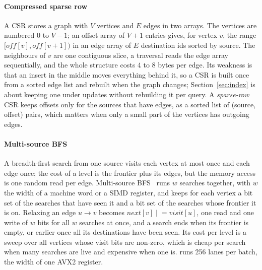 \paragraph{Compressed sparse row} A CSR stores a graph with $V$ vertices and $E$ edges in two arrays. The vertices are
numbered $0$ to $V-1$; an offset array of $V+1$ entries gives, for vertex $v$, the range $[\mathit{off}[v],
\mathit{off}[v+1])$ in an edge array of $E$ destination ids sorted by source. The neighbours of $v$ are one contiguous
slice, a traversal reads the edge array sequentially, and the whole structure costs $4$ to $8$ bytes per edge. Its
weakness is that an insert in the middle moves everything behind it, so a CSR is built once from a sorted edge list
and rebuilt when the graph changes; Section~\ref{sec:index} is about keeping one under updates without rebuilding it
per query. A \emph{sparse-row} CSR keeps offsets only for the sources that have edges, as a sorted list of (source,
offset) pairs, which matters when only a small part of the vertices has outgoing edges.

\paragraph{Multi-source BFS} A breadth-first search from one source visits each vertex at most once and each edge
once; the cost of a level is the frontier plus its edges, but the memory access is one random read per edge.
Multi-source BFS~\cite{then2014msbfs} runs $w$ searches together, with $w$ the width of a machine word or a SIMD
register, and keeps for each vertex a bit set of the searches that have seen it and a bit set of the searches whose
frontier it is on. Relaxing an edge $u \to v$ becomes $\mathit{next}[v] \mathrel{|}= \mathit{visit}[u]$, one read and one write
of $w$ bits for all $w$ searches at once, and a search ends when its frontier is empty, or earlier once all its destinations have been seen. Its cost per
level is a sweep over all vertices whose visit bits are non-zero, which is cheap per search when many searches are
live and expensive when one is. \duckpgq runs 256 lanes per batch, the width of one AVX2 register.
